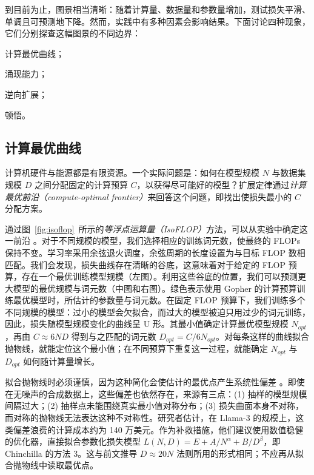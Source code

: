 到目前为止，图景相当清晰：随着计算量、数据量和参数量增加，测试损失平滑、单调且可预测地下降。然而，实践中有多种因素会影响结果。下面讨论四种现象，它们分别探查这幅图景的不同边界：
\begin{enumerate*}[label=(\arabic*)]
    \item 计算最优曲线；
    \item 涌现能力；
    \item 逆向扩展；
    \item 顿悟。
\end{enumerate*}

\subsection{计算最优曲线}
计算机硬件与能源都是有限资源。一个实际问题是：如何在模型规模 $N$ 与数据集规模 $D$ 之间分配固定的计算预算 $C$，以获得尽可能好的模型？扩展定律通过\emph{计算最优前沿（compute-optimal frontier）}来回答这个问题，即找出使损失最小的 $C$ 分配方案。

通过图~\ref{fig:isoflop}~所示的\emph{等浮点运算量（IsoFLOP）}方法，可以从实验中确定这一前沿 \citep{10.5555/3600270.3602446}。对于不同规模的模型，我们选择相应的训练词元数，使最终的 FLOPs 保持不变。学习率采用余弦退火调度，余弦周期的长度设置为与目标 FLOP 数相匹配。我们会发现，损失曲线存在清晰的谷底，这意味着对于给定的 FLOP 预算，存在一个最优训练模型规模（左图）。利用这些谷底的位置，我们可以预测更大模型的最优规模与词元数（中图和右图）。绿色表示使用 Gopher 的计算预算训练最优模型时，所估计的参数量与词元数。在固定 FLOP 预算下，我们训练多个不同规模的模型：过小的模型会欠拟合，而过大的模型被迫只用过少的词元训练，因此，损失随模型规模变化的曲线呈 U 形。其最小值确定计算最优模型规模 $N_{opt}$，再由 $C \approx 6ND$ 得到与之匹配的词元数 $D_{opt} = C / 6N_{opt}$。对每条这样的曲线拟合抛物线，就能定位这个最小值；在不同预算下重复这一过程，就能确定 $N_{opt}$ 与 $D_{opt}$ 如何随计算量增长。

拟合抛物线时必须谨慎，因为这种简化会使估计的最优点产生系统性偏差 \citep{czech2026problemschinchillaapproach2}。即使在无噪声的合成数据上，这些偏差也依然存在，来源有三点：(1) 抽样的模型规模间隔过大；(2) 抽样点未能围绕真实最小值对称分布；(3) 损失曲面本身不对称，而对称的抛物线无法表达这种不对称性。研究者估计，在 Llama-3 的规模上，这类偏差浪费的计算成本约为 140 万美元。作为补救措施，他们建议使用数值稳健的优化器，直接拟合参数化损失模型 $L(N,D) = E + A/N^{\alpha} + B/D^{\beta}$，即 Chinchilla 的方法 3。这与前文推导 $D \approx 20N$ 法则所用的形式相同；不应再从拟合抛物线中读取最优点。

